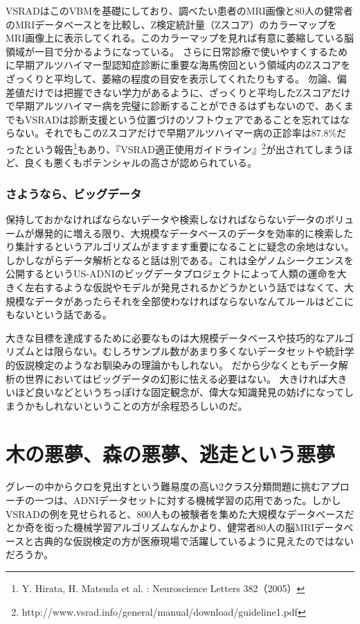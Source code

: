 VSRADはこのVBMを基礎にしており、調べたい患者のMRI画像と80人の健常者のMRIデータベースとを比較し、Z検定統計量（Zスコア）のカラーマップをMRI画像上に表示してくれる。このカラーマップを見れば有意に萎縮している脳領域が一目で分かるようになっている。
さらに日常診療で使いやすくするために早期アルツハイマー型認知症診断に重要な海馬傍回という領域内のZスコアをざっくりと平均して、萎縮の程度の目安を表示してくれたりもする。
勿論、偏差値だけでは把握できない学力があるように、ざっくりと平均したZスコアだけで早期アルツハイマー病を完璧に診断することができるはずもないので、あくまでもVSRADは診断支援という位置づけのソフトウェアであることを忘れてはならない。それでもこのZスコアだけで早期アルツハイマー病の正診率は87.8\%だったという報告\footnote{Y. Hirata, H. Matsuda et al. : Neuroscience Letters 382（2005）}もあり、『VSRAD適正使用ガイドライン』\footnote{http://www.vsrad.info/general/manual/download/guideline1.pdf}が出されてしまうほど、良くも悪くもポテンシャルの高さが認められている。

\subsubsection{さようなら、ビッグデータ}
保持しておかなければならないデータや検索しなければならないデータのボリュームが爆発的に増える限り、大規模なデータベースのデータを効率的に検索したり集計するというアルゴリズムがますます重要になることに疑念の余地はない。
しかしながらデータ解析となると話は別である。これは全ゲノムシークエンスを公開するというUS-ADNIのビッグデータプロジェクトによって人類の運命を大きく左右するような仮説やモデルが発見されるかどうかという話ではなくて、大規模なデータがあったらそれを全部使わなければならないなんてルールはどこにもないという話である。

大きな目標を達成するために必要なものは大規模データベースや技巧的なアルゴリズムとは限らない。むしろサンプル数があまり多くないデータセットや統計学的仮説検定のようなお馴染みの理論かもしれない。
だから少なくともデータ解析の世界においてはビッグデータの幻影に怯える必要はない。
大きければ大きいほど良いなどというちっぽけな固定観念が、偉大な知識発見の妨げになってしまうかもしれないということの方が余程恐ろしいのだ。

\section{木の悪夢、森の悪夢、逃走という悪夢}
グレーの中からクロを見出すという難易度の高い2クラス分類問題に挑むアプローチの一つは、ADNIデータセットに対する機械学習の応用であった。しかしVSRADの例を見せられると、800人もの被験者を集めた大規模なデータベースだとか奇を衒った機械学習アルゴリズムなんかより、健常者80人の脳MRIデータベースと古典的な仮説検定の方が医療現場で活躍しているように見えたのではないだろうか。

